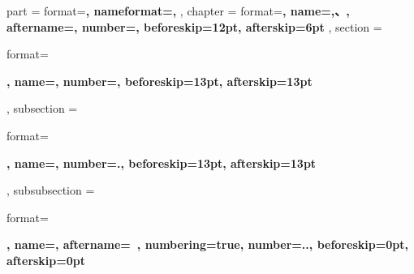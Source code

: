 \ctexset
{
    part =
    {
        format=\centering{}\bfseries,
        nameformat=\centering\heiti\fontsize{48}{48},
    },
    chapter =
    {
        format=\centering{}\bfseries,
        name={,、},
        aftername=,
        number=,
        beforeskip=12pt,
        afterskip=6pt
    },
    section =
    {
        format=\raggedright{}\bfseries,
        name={},
        number=,
        beforeskip=13pt,
        afterskip=13pt
    },
    subsection =
    {
        format=\raggedright{}\bfseries,
        name={},
        number=.,
        beforeskip=13pt,
        afterskip=13pt
    },
    subsubsection =
    {
        format=\raggedright{}\bfseries,
        name={},
        aftername=~,
        numbering=true,
        number=..,
        beforeskip=0pt,
        afterskip=0pt
    }
}

\makeatletter
{}
\makeatother
